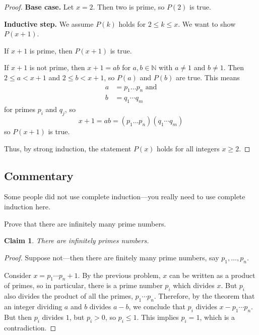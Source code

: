 \documentclass[12pt]{midterm}
\newtheorem*{claim}{Claim}
\begin{document}
\begin{exam}
\begin{solution}
\begin{solutiontext}
\begin{proof}
\textbf{Base case.}  Let $x = 2$.  Then two is prime, so $P(2)$ is true.

\textbf{Inductive step.}  We assume $P(k)$ holds for $2 \leq k \leq
x$.  We want to show $P(x+1)$.

If $x+1$ is prime, then $P(x+1)$ is true.

If $x+1$ is not prime, then $x+1 = ab$ for $a,b \in \mathbb{N}$ with
$a \neq 1$ and $b \neq 1$.  Then $2 \leq a < x+1$ and $2 \leq b <
x+1$, so $P(a)$ and $P(b)$ are true.  This means
\begin{align*}
a &= p_1 \ldots p_n \mbox{ and} \\
b &= q_1 \cdots q_m 
\end{align*}
for primes $p_i$ and $q_j$, so
$$
x + 1 = ab = (p_1 \ldots p_n) (q_1 \cdots q_m)
$$
so $P(x+1)$ is true.

Thus, by strong induction, the statement $P(x)$ holds for all integers
$x \geq 2$.
\end{proof}


\color{magenta!50!black}
\vfill
\setlength{\leftskip}{0in}
\subsection*{Commentary}

Some people did not use complete induction---you really need to use complete induction here.


\end{solutiontext}\end{solution}

\begin{problem}[360]
  Prove that there are infinitely many prime numbers.
\end{problem}

\begin{solution}\begin{solutiontext}
    \begin{claim}
      There are infinitely primes numbers.
    \end{claim}
    \begin{proof}
      Suppose not---then there are finitely many prime numbers, say $p_1, \ldots, p_n$.

      Consider $x = p_1 \cdots p_n + 1$.  By the previous problem, $x$
      can be written as a product of primes, so in particular, there
      is a prime number $p_i$ which divides $x$.  But $p_i$ also
      divides the product of all the primes, $p_1 \cdots p_n$.
      Therefore, by the theorem that an integer dividing $a$ and $b$
      divides $a - b$, we conclude that $p_i$ divides $x - p_1 \cdots
      p_n$.  But then $p_i$ divides $1$, but $p_i > 0$, so $p_i \leq
      1$. This implies $p_i = 1$, which is a contradiction.
    \end{proof}


\end{solutiontext}
\end{solution}
\end{exam}
\end{document}
